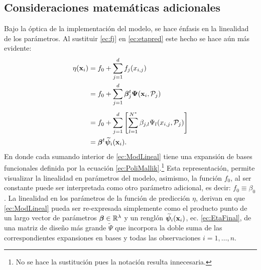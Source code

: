 \documentclass[../Main/Main.tex]{subfiles}
\begin{document}
\subsection{Consideraciones matemáticas adicionales}
Bajo la óptica de la implementación del modelo, se hace énfasis en la linealidad de los parámetros. Al sustituir \eqref{ec:fj} en \eqref{ec:etapred} este hecho se hace aún más evidente:
\begin{align}
	\eta(\mathbf{x}_i) &= f_0 + \sum_{j=1}^d f_j(x_{i,j}) \nonumber\\
			   &= f_0 + \sum_{j=1}^d \bm{\beta}^t_j\bm{\Psi}(\mathbf{x}_i,\mathcal{P}_j) \nonumber\\[4pt]
	&= f_0 + \sum_{j=1}^d  \left[\sum_{l = 1}^{N^*} \beta_{j,l} \Psi_l(x_{i,j}, \mathcal{P}_j)\right]  \label{ec:ModLineal} \\  
	& = \bm{\beta}^t\widetilde{\bm{\psi}}_i(\mathbf{x}_i). \label{ec:EtaFinal}
\end{align}
En donde cada sumando interior de \eqref{ec:ModLineal} tiene una expansión de bases funcionales definida por la ecuación \eqref{ec:PoliMallik}.\footnote{No se hace la sustitución pues la notación resulta innecesaria.} Esta representación, permite visualizar la linealidad en parámetros del modelo, asimismo, la función $f_0$, al ser constante puede ser interpretada como otro parámetro adicional, es decir: $f_0 \equiv \beta_0$. La linealidad en los parámetros de la función de predicción $\eta$, derivan en que \eqref{ec:ModLineal} pueda ser re-expresada simplemente como el producto punto de un largo vector de parámetros $\bm{\beta}\in\mathbb{R}^\lambda$ y un renglón  $\widetilde{\bm{\psi}}_i(\mathbf{x}_i)$, ec. \eqref{ec:EtaFinal}, de una matriz de diseño más grande $\widetilde{\Psi}$ que incorpora la doble suma de las correspondientes expansiones en bases y todas las observaciones $i = 1,\ldots,n$. 
\end{document}
